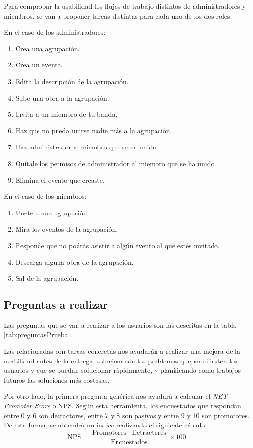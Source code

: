 Para comprobar la usabilidad los flujos de trabajo distintos de administradores y miembros, se van a proponer tareas distintas para cada uno de los dos roles.

En el caso de los administradores:

\begin{enumerate}
    \item Crea una agrupación.
    \item Crea un evento.
    \item Edita la descripción de la agrupación.
    \item Sube una obra a la agrupación.
    \item Invita a un miembro de tu banda.
    \item Haz que no pueda unirse nadie más a la agrupación.
    \item Haz administrador al miembro que se ha unido.
    \item Quítale los permisos de administrador al miembro que se ha unido.
    \item Elimina el evento que creaste.
\end{enumerate}

En el caso de los miembros:

\begin{enumerate}
    \item Únete a una agrupación.
    \item Mira los eventos de la agrupación.
    \item Responde que no podrás asistir a algún evento al que estés invitado.
    \item Descarga alguna obra de la agrupación.
    \item Sal de la agrupación.
\end{enumerate}


\subsection{Preguntas a realizar}

Las preguntas que se van a realizar a los usuarios son las descritas en la tabla \ref{tab:preguntasPrueba}.

Las relacionadas con tareas concretas nos ayudarán a realizar una mejora de la usabilidad antes de la entrega, solucionando los problemas que manifiesten los usuarios y que se puedan solucionar rápidamente, y planificando como trabajos futuros las soluciones más costosas.

Por otro lado, la primera pregunta genérica nos ayudará a calcular el \textit{NET Promoter Score} o NPS. Según esta herramienta, los encuestados que respondan entre 0 y 6 son detractores, entre 7 y 8 son pasivos y entre 9 y 10 son promotores. De esta forma, se obtendrá un índice realizando el siguiente cálculo:
\[
\textrm{NPS} = \frac{\textrm{Promotores} - \textrm{Detractores}}{\textrm{Encuestados}} \times 100
\]

